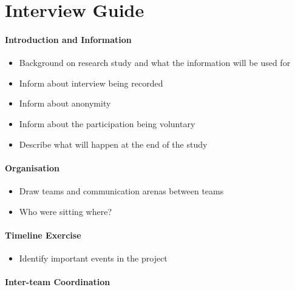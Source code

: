 \chapter{Interview Guide}
\label{interview_guide}

\subsubsection{Introduction and Information}

\begin{itemize}
	\item Background on research study and what the information will be used for
	\item Inform about interview being recorded
	\item Inform about anonymity
	\item Inform about the participation being voluntary
	\item Describe what will happen at the end of the study
\end{itemize}

\subsubsection{Organisation}

\begin{itemize}
	\item Draw teams and communication arenas between teams
	\item Who were sitting where?
\end{itemize}

\subsubsection{Timeline Exercise}

\begin{itemize}
	\item Identify important events in the project
\end{itemize}

\subsubsection{Inter-team Coordination}

